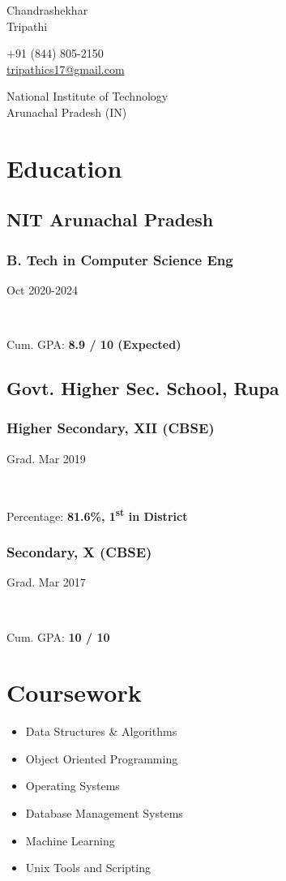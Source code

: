 \documentclass[]{article}
\newcommand{\namesection}[3]{
  \begin{multicols}{2}
    \begin{flushleft}
      \fontsize{30pt}{25pt}
      \fontspec[Path = fonts/ZillaSlab/]{ZillaSlab-Light}
      {{ #1 }\\{ #2 }}
      \columnbreak\\
    \end{flushleft}
    \begin{flushright}
      { #3 }
    \end{flushright}
  \end{multicols}
  \vspace{-10pt}
}
\newcommand{\subheading}[2]{
  {\subsection{#1}
  \hfill{#2}}\\
  \vspace{2pt}
}
\newcommand{\subsubheading}[2]{
  {\subsubsection{#1}
  \hfill \small#2} \\
  \vspace{2pt}
}
\newenvironment{tightemize}{
\vspace{-8pt}\begin{itemize}\itemsep1pt \parskip0pt \parsep0pt}
{\end{itemize}\vspace{-\topsep}}
\begin{document}
\namesection{Chandrashekhar}{Tripathi}{+91 (844) 805-2150\\
  \href{mailto:tripathics17@gmail.com}{tripathics17@gmail.com}
  \par
  National Institute of Technology\\
  Arunachal Pradesh (IN)}

\noindent\makebox[\linewidth]{\color{light}\rule{\paperwidth}{0.2pt}}
\vspace{-15pt}

\begin{multicols}{2}
  \begin{flushleft}
    \section{Education}    
    \subsection{NIT Arunachal Pradesh}
    \subsubheading{B. Tech in Computer Science Eng}{Oct 2020-2024}
    Cum. GPA: \textbf{8.9 / 10 (Expected)}

    \subsection{Govt. Higher Sec. School, Rupa}
    \subsubheading{Higher Secondary, XII (CBSE)}{Grad. Mar 2019}
    Percentage: \textbf{81.6\%, 1\textsuperscript{st} in District}

    \subsubheading{Secondary, X (CBSE)}{Grad. Mar 2017}
    Cum. GPA: \textbf{10 / 10}
    
    
    \section{Coursework}
    \begin{tightemize}
      \item Data Structures \& Algorithms
      \item Object Oriented Programming
      \item Operating Systems
      \item Database Management Systems
      \item Machine Learning
      \item Unix Tools and Scripting
    \end{tightemize}


\end{flushleft}
\end{multicols}
\end{document}
